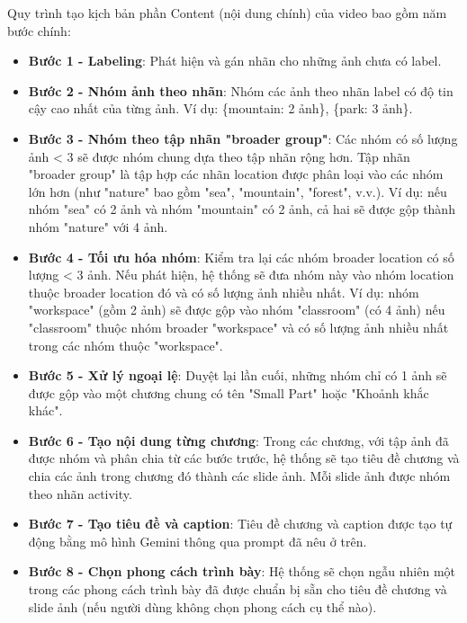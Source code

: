 Quy trình tạo kịch bản phần Content (nội dung chính) của video bao gồm năm bước chính:

\begin{itemize}
    \item \textbf{Bước 1 - Labeling}: Phát hiện và gán nhãn cho những ảnh chưa có label.
    
    \item \textbf{Bước 2 - Nhóm ảnh theo nhãn}: Nhóm các ảnh theo nhãn label có độ tin cậy cao nhất của từng ảnh. Ví dụ: \{mountain: 2 ảnh\}, \{park: 3 ảnh\}.
    
    \item \textbf{Bước 3 - Nhóm theo tập nhãn "broader group"}: Các nhóm có số lượng ảnh < 3 sẽ được nhóm chung dựa theo tập nhãn rộng hơn. Tập nhãn "broader group" là tập hợp các nhãn location được phân loại vào các nhóm lớn hơn (như "nature" bao gồm "sea", "mountain", "forest", v.v.). Ví dụ: nếu nhóm "sea" có 2 ảnh và nhóm "mountain" có 2 ảnh, cả hai sẽ được gộp thành nhóm "nature" với 4 ảnh.
    
    \item \textbf{Bước 4 - Tối ưu hóa nhóm}: Kiểm tra lại các nhóm broader location có số lượng < 3 ảnh. Nếu phát hiện, hệ thống sẽ đưa nhóm này vào nhóm location thuộc broader location đó và có số lượng ảnh nhiều nhất. Ví dụ: nhóm "workspace" (gồm 2 ảnh) sẽ được gộp vào nhóm "classroom" (có 4 ảnh) nếu "classroom" thuộc nhóm broader "workspace" và có số lượng ảnh nhiều nhất trong các nhóm thuộc "workspace".
    
    \item \textbf{Bước 5 - Xử lý ngoại lệ}: Duyệt lại lần cuối, những nhóm chỉ có 1 ảnh sẽ được gộp vào một chương chung có tên "Small Part" hoặc "Khoảnh khắc khác".
    \item \textbf{Bước 6 - Tạo nội dung từng chương}: Trong các chương, với tập ảnh đã được nhóm và phân chia từ các bước trước, hệ thống sẽ tạo tiêu đề chương và chia các ảnh trong chương đó thành các slide ảnh. Mỗi slide ảnh được nhóm theo nhãn activity. 
    \item \textbf{Bước 7 - Tạo tiêu đề và caption}: Tiêu đề chương và caption được tạo tự động bằng mô hình Gemini thông qua prompt đã nêu ở trên. 
    \item \textbf{Bước 8 - Chọn phong cách trình bày}: Hệ thống sẽ chọn ngẫu nhiên một trong các phong cách trình bày đã được chuẩn bị sẵn cho tiêu đề chương và slide ảnh (nếu người dùng không chọn phong cách cụ thể nào).
\end{itemize}

